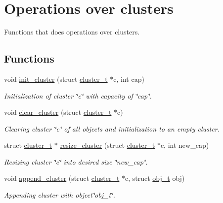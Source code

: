\hypertarget{group___cluster_operations}{}\section{Operations over clusters}
\label{group___cluster_operations}


Functions that does operations over clusters.  


\subsection*{Functions}
\begin{DoxyCompactItemize}
\item 
void \mbox{\hyperlink{group___cluster_operations_ga96db0862471d90abb3d80103ef3695f7}{init\+\_\+cluster}} (struct \mbox{\hyperlink{structcluster__t}{cluster\+\_\+t}} $\ast$c, int cap)
\begin{DoxyCompactList}\small\item\em Initialization of cluster \char`\"{}c\char`\"{} with capacity of \char`\"{}cap\char`\"{}. \end{DoxyCompactList}\item 
void \mbox{\hyperlink{group___cluster_operations_ga8289f092f205baeb13cf33cfffa15324}{clear\+\_\+cluster}} (struct \mbox{\hyperlink{structcluster__t}{cluster\+\_\+t}} $\ast$c)
\begin{DoxyCompactList}\small\item\em Clearing cluster \char`\"{}c\char`\"{} of all objects and initialization to an empty cluster. \end{DoxyCompactList}\item 
struct \mbox{\hyperlink{structcluster__t}{cluster\+\_\+t}} $\ast$ \mbox{\hyperlink{group___cluster_operations_ga0d8702f8bee3bccb81380e012a615a3d}{resize\+\_\+cluster}} (struct \mbox{\hyperlink{structcluster__t}{cluster\+\_\+t}} $\ast$c, int new\+\_\+cap)
\begin{DoxyCompactList}\small\item\em Resizing cluster \char`\"{}c\char`\"{} into desired size \char`\"{}new\+\_\+cap\char`\"{}. \end{DoxyCompactList}\item 
void \mbox{\hyperlink{group___cluster_operations_gab6269b64b2c7f4842a51c58b2d86a2e5}{append\+\_\+cluster}} (struct \mbox{\hyperlink{structcluster__t}{cluster\+\_\+t}} $\ast$c, struct \mbox{\hyperlink{structobj__t}{obj\+\_\+t}} obj)
\begin{DoxyCompactList}\small\item\em Appending cluster with object\char`\"{}obj\+\_\+t\char`\"{}. \end{DoxyCompactList}\item 

\end{DoxyCompactItemize}
